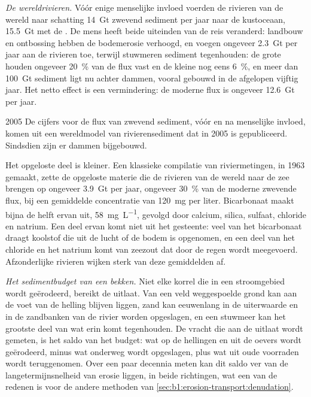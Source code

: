 \emph{De wereldrivieren.} Vóór enige menselijke invloed voerden de rivieren van de wereld naar schatting \qty{14}{Gt} zwevend sediment per jaar naar de kustoceaan, \qty{15.5}{Gt} met de . De mens heeft beide uiteinden van de reis veranderd: landbouw en ontbossing hebben de bodemerosie verhoogd, en voegen ongeveer \qty{2.3}{Gt} per jaar aan de rivieren toe, terwijl stuwmeren sediment tegenhouden: de grote houden ongeveer \qty{20}{\percent} van de flux vast en de kleine nog eens \qty{6}{\percent}, en meer dan \qty{100}{Gt} sediment ligt nu achter dammen, vooral gebouwd in de afgelopen vijftig jaar. Het netto effect is een vermindering: de moderne flux is ongeveer \qty{12.6}{Gt} per jaar.

\begin{dated}{2005}
De cijfers voor de flux van zwevend sediment, vóór en na menselijke invloed, komen uit een wereldmodel van rivierensediment dat in 2005 is gepubliceerd. Sindsdien zijn er dammen bijgebouwd.
\end{dated}

Het opgeloste deel is kleiner. Een klassieke compilatie van riviermetingen, in 1963 gemaakt, zette de opgeloste materie die de rivieren van de wereld naar de zee brengen op ongeveer \qty{3.9}{Gt} per jaar, ongeveer \qty{30}{\percent} van de moderne zwevende flux, bij een gemiddelde concentratie van \qty{120}{mg} per liter. Bicarbonaat maakt bijna de helft ervan uit, \qty{58}{mg.L^{-1}}, gevolgd door calcium, silica, sulfaat, chloride en natrium. Een deel ervan komt niet uit het gesteente: veel van het bicarbonaat draagt koolstof die uit de lucht of de bodem is opgenomen, en een deel van het chloride en het natrium komt van zeezout dat door de regen wordt meegevoerd. Afzonderlijke rivieren wijken sterk van deze gemiddelden af.

\emph{Het sedimentbudget van een bekken.} Niet elke korrel die in een stroomgebied wordt geërodeerd, bereikt de uitlaat. Van een veld weggespoelde grond kan aan de voet van de helling blijven liggen, zand kan eeuwenlang in de uiterwaarde en in de zandbanken van de rivier worden opgeslagen, en een stuwmeer kan het grootste deel van wat erin komt tegenhouden. De vracht die aan de uitlaat wordt gemeten, is het saldo van het budget: wat op de hellingen en uit de oevers wordt geërodeerd, minus wat onderweg wordt opgeslagen, plus wat uit oude voorraden wordt teruggenomen. Over een paar decennia meten kan dit saldo ver van de langetermijnsnelheid van erosie liggen, in beide richtingen, wat een van de redenen is voor de andere methoden van \cref{sec:b1:erosion-transport:denudation}.

